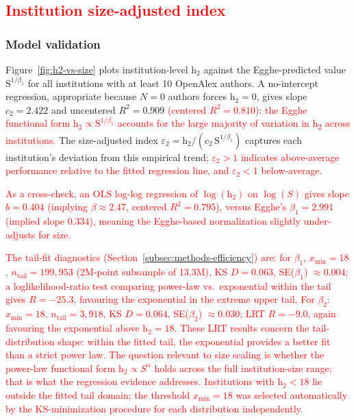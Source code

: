\subsection{\textcolor{red}{Institution size-adjusted index}}
\label{subsec:h2-efficiency}

\subsubsection*{Model validation}
Figure~\ref{fig:h2-vs-size} plots institution-level $\mathrm{h}_2$ against the Egghe-predicted value $\mathrm{S}^{1/\beta_1}$ for all institutions with at least 10 OpenAlex authors. A no-intercept regression, appropriate because $N = 0$ authors forces $\mathrm{h}_2 = 0$, gives slope $c_2 = 2.422$ and uncentered $R^2 = 0.909$ \textcolor{red}{(centered $R^2 = 0.810$)}: \textcolor{red}{the Egghe functional form $\mathrm{h}_2 \propto \mathrm{S}^{1/\beta_1}$ accounts for the large majority of variation in h\textsubscript{2} across institutions.} The size-adjusted index $\varepsilon_2 = \mathrm{h}_2 / (c_2\,\mathrm{S}^{1/\beta_1})$ captures each institution's deviation from this empirical trend\textcolor{red}{; $\varepsilon_2 > 1$ indicates above-average performance relative to the fitted regression line, and $\varepsilon_2 < 1$ below-average.}

\textcolor{red}{As a cross-check, an OLS log-log regression of $\log(\mathrm{h}_2)$ on $\log(S)$ gives slope $b = 0.404$ (implying $\beta \approx 2.47$, centered $R^2 = 0.795$), versus Egghe's $\beta_1 = 2.991$ (implied slope $0.334$), meaning the Egghe-based normalization slightly under-adjusts for size.}

\textcolor{red}{The tail-fit diagnostics (Section~\ref{subsec:methods-efficiency}) are: for $\beta_1$, $x_{\min} = 18$, $n_\text{tail} = 199{,}953$ (2M-point subsample of 13.3M), KS $D = 0.063$, SE($\beta_1$) $\approx 0.004$; a loglikelihood-ratio test comparing power-law vs.\ exponential within the tail gives $R = -25.3$, favouring the exponential in the extreme upper tail. For $\beta_2$: $x_{\min} = 18$, $n_\text{tail} = 3{,}918$, KS $D = 0.064$, SE($\beta_2$) $\approx 0.030$; LRT $R = -9.0$, again favouring the exponential above $\mathrm{h}_2 = 18$. These LRT results concern the tail-distribution shape: within the fitted tail, the exponential provides a better fit than a strict power law. The question relevant to size scaling is whether the power-law functional form $\mathrm{h}_2 \propto S^\alpha$ holds across the full institution-size range; that is what the regression evidence addresses. Institutions with $\mathrm{h}_2 < 18$ lie outside the fitted tail domain; the threshold $x_{\min} = 18$ was selected automatically by the KS-minimization procedure for each distribution independently.}

